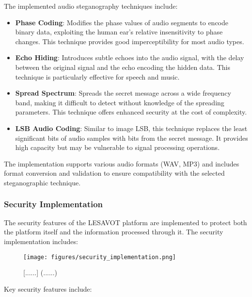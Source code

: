 \documentclass[12pt, a4paper, oneside]{book}
\begin{document}
The implemented audio steganography techniques include:

\begin{itemize}[leftmargin=*]
    \item \textbf{Phase Coding}: Modifies the phase values of audio segments to encode binary data, exploiting the human ear's relative insensitivity to phase changes. This technique provides good imperceptibility for most audio types.

    \item \textbf{Echo Hiding}: Introduces subtle echoes into the audio signal, with the delay between the original signal and the echo encoding the hidden data. This technique is particularly effective for speech and music.

    \item \textbf{Spread Spectrum}: Spreads the secret message across a wide frequency band, making it difficult to detect without knowledge of the spreading parameters. This technique offers enhanced security at the cost of complexity.

    \item \textbf{LSB Audio Coding}: Similar to image LSB, this technique replaces the least significant bits of audio samples with bits from the secret message. It provides high capacity but may be vulnerable to signal processing operations.
\end{itemize}

The implementation supports various audio formats (WAV, MP3) and includes format conversion and validation to ensure compatibility with the selected steganographic technique.

\subsubsection{Security Implementation}

The security features of the LESAVOT platform are implemented to protect both the platform itself and the information processed through it. The security implementation includes:

\begin{figure}[htbp]
    \centering
    \texttt{[image: figures/security\_implementation.png]}
    \caption{[......] (......)}
    \label{fig:security_implementation}
\end{figure}

Key security features include:
\end{document}
